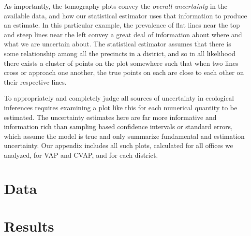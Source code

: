 \documentclass[12pt]{article}
\begin{document}
As importantly, the tomography plots convey the \emph{overall
  uncertainty} in the available data, and how our statistical
estimator uses that information to produce an estimate.  In this
particular example, the prevalence of flat lines near the top and
steep lines near the left convey a great deal of information about
where and what we are uncertain about.  The statistical estimator
assumes that there is some relationship among all the precincts in a
district, and so in all likelihood there exists a cluster of points on
the plot somewhere such that when two lines cross or approach one
another, the true points on each are close to each other on their
respective lines.  

To appropriately and completely judge all sources of uncertainty in
ecological inferences requires examining a plot like this for each
numerical quantity to be estimated.  The uncertainty estimates here
are far more informative and information rich than sampling based
confidence intervals or standard errors, which assume the model is
true and only summarize fundamental and estimation uncertainty.  Our
appendix includes all such plots, calculated for all offices we
analyzed, for VAP and CVAP, and for each district.



\section{Data}\label{s:data}

\section{Results}\label{s:res}

\singlespace
 
\bibsep=0in 
{}

\end{document}
